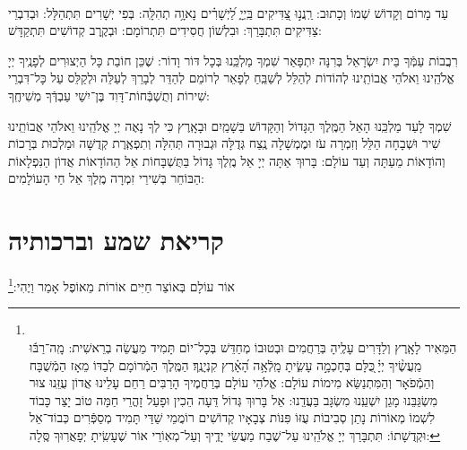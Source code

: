 \documentclass[twoside, openany, parskip=half, 11pt]{book}
\begin{document}
\\
 עַד מָרוֹם וְקָדוֹשׁ שְׁמוֹ וְכָתוּב: רַֽנֲנ֣וּ צַ֭דִּיקִים בַּֽיְיָ֑ לַ֝יְשָׁרִ֗ים נָאוָ֥ה תְהִלָּֽה: בְּפִי יְשָׁרִים תִּתְהַלָּל:  וּבְדִבְרֵי צַדִּיקִים תִּתְבָּרַךְ: וּבִלְשׁוֹן חֲסִידִים תִּתְרוֹמָם: וּבְקֶֽרֶב קְדוֹשִׁים תִּתְקַדָּשׁ:
 
  רִבֲבוֹת עַמְּֿךָ בֵּית יִשְׂרָאֵל בְּרִנָּה יִתְפָּאַר שִׁמְךָ מַלְכֵּֽנוּ בְּכָל דּוֹר וָדוֹר: שֶׁכֵּן חוֹבַת כָּל הַיְצוּרִים לְפָנֶֽיךָ יְיָ אֱלֹהֵֽינוּ וֵאלֹהֵי אֲבוֹתֵֽינוּ לְהוֹדוֹת לְהַלֵּל לְשַׁבֵּֽחַ לְפָאֵר לְרוֹמֵם לְהַדֵּר לְבָרֵךְ לְעַלֵּה וּלְקַלֵּס עַל כָּל־דִּבְרֵי שִׁירוֹת וְתֻשְׁבְּֿחוֹת־דָּוִד בֶּן־יִשַׁי עַבְדְּֿךָ מְשִׁיחֶֽךָ:


 שִׁמְךָ לָעַד מַלְכֵּֽנוּ הָאֵל הַמֶּֽלֶךְ הַגָּדוֹל וְהַקָּדוֹשׁ בַּשָׁמַֽיִם וּבָאָֽרֶץ כִּי לְךָ נָאֶה יְיָ אֱלֹהֵֽינוּ וֵאלֹהֵי אֲבוֹתֵֽינוּ שִׁיר וּשְׁבָחָה הַלֵּל וְזִמְרָה עֹז וּמֶמְשָׁלָה נֶֽצַח גְּדֻלָּה וּגְבוּרָה תְּהִלָּה וְתִפְאֶֽרֶת קְדֻשָּׁה וּמַלְכוּת בְּרָכוֹת וְהוֹדָאוֹת מֵעַתָּה וְעַד עוֹלָם: 
 בָּרוּךְ אַתָּה יְיָ אֵל מֶֽלֶךְ גָּדוֹל בַּתֻּשְׁבָּחוֹת אֵל הַהוֹדָאוֹת אֲדוֹן הַנִּפְלָאוֹת הַבּוֹחֵר בְּשִׁירֵי זִמְרָה מֶֽלֶךְ אֵל חַי הָעוֹלָמִים:

\halfkaddish

\section[קריאת שמע וברכותיה]{ קריאת שמע וברכותיה }

\barachu


אוֹר עוֹלָם בְּאוֹצַר חַיִּים אוֹרוֹת מֵאוֹפֶל אָמַר וַיֶהִי:\footnote{\\
הַמֵּאִיר לָאָֽרֶץ וְלַדָּרִים עָלֶֽיהָ בְּרַחֲמִים וּבְטוּבוֹ מְחַדֵּשׁ בְּכָל־יוֹם תָּמִיד מַעֲשֵׂה בְרֵאשִׁית: 
 מָֽה־רַבּ֬וּ מַֽעֲשֶׂ֨יךָ יְיָ֗ ֖כֻּלָּם בְּחָכְמָ֣ה עָשִׂ֑יתָ מָֽלְֿאָ֥ה הָ֝אָ֗רֶץ קִנְיָנֶֽךָ׃ הַמֶּֽלֶךְ הַמְֿרוֹמָם לְבַדּוֹ מֵאָז הַמְֿשֻׁבָּח וְהַמְֿפֹאָר וְהַמִּתְנַשֵּׂא מִימוֹת עוֹלָם: אֱלֹהֵי עוֹלָם בְּרַחֲמֶיךָ הָרַבִּים רַחֵם עָלֵינוּ אֲדוֹן עֻזֵּֽנוּ צוּר מִשְׂגַּבֵּנוּ מָגֵן יִשְׁעֵֽנוּ מִשְׂגָּב בַּעֲדֵֽנוּ: אֵל בָּרוּךְ גְּדוֹל דֵּעָה הֵכִין וּפָעַל זָהֳרֵי חַמָּה טוֹב יָצַר כָּבוֹד לִשְׁמוֹ מְאוֹרוֹת נָתַן סְבִיבוֹת עֻזּוֹ פִּנּוֹת צְבָאָיו קְדוֹשִׁים רוֹמֲמֵי שַׁדַּי תָּמִיד מְסַפְּֿרִים כְּבוֹד־אֵל וּקְדֻשָׁתוֹ: תִּתְבָּרַךְ יְיָ אֱלֹהֵֽינוּ עַל־שֶׁבַח מַעֲשֵׂי יָדֶֽיךָ וְעַל־מְאֽוֹרֵי אוֹר שֶׁעָשִֽׂיתָ יְפָאֲרֽוּךָ סֶּֽלָה: 
}
\end{document}
